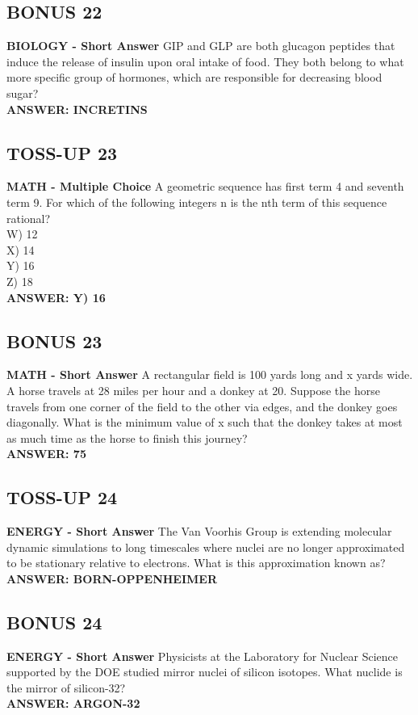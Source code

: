 \documentclass{article}
\begin{document}
\subsection*{BONUS 22}
\textbf{BIOLOGY - Short Answer} GIP and GLP are both glucagon peptides that induce the release of insulin upon oral intake of food. They both belong to what more specific group of hormones, which are responsible for decreasing blood sugar? \\
\textbf{ANSWER: INCRETINS}

\subsection*{TOSS-UP 23}
\textbf{MATH - Multiple Choice} A geometric sequence has first term 4 and seventh term 9. For which of the following integers n is the nth term of this sequence rational? \\
W) 12 \\
X) 14 \\
Y) 16 \\
Z) 18 \\
\textbf{ANSWER: Y) 16}

\subsection*{BONUS 23}
\textbf{MATH - Short Answer} A rectangular field is 100 yards long and x yards wide. A horse travels at 28 miles per hour and a donkey at 20. Suppose the horse travels from one corner of the field to the other via edges, and the donkey goes diagonally. What is the minimum value of x such that the donkey takes at most as much time as the horse to finish this journey? \\
\textbf{ANSWER: 75}

\subsection*{TOSS-UP 24}
\textbf{ENERGY - Short Answer} The Van Voorhis Group is extending molecular dynamic simulations to long timescales where nuclei are no longer approximated to be stationary relative to electrons. What is this approximation known as? \\
\textbf{ANSWER: BORN-OPPENHEIMER}

\subsection*{BONUS 24}
\textbf{ENERGY - Short Answer} Physicists at the Laboratory for Nuclear Science supported by the DOE studied mirror nuclei of silicon isotopes. What nuclide is the mirror of silicon-32? \\
\textbf{ANSWER: ARGON-32}
\end{document}
